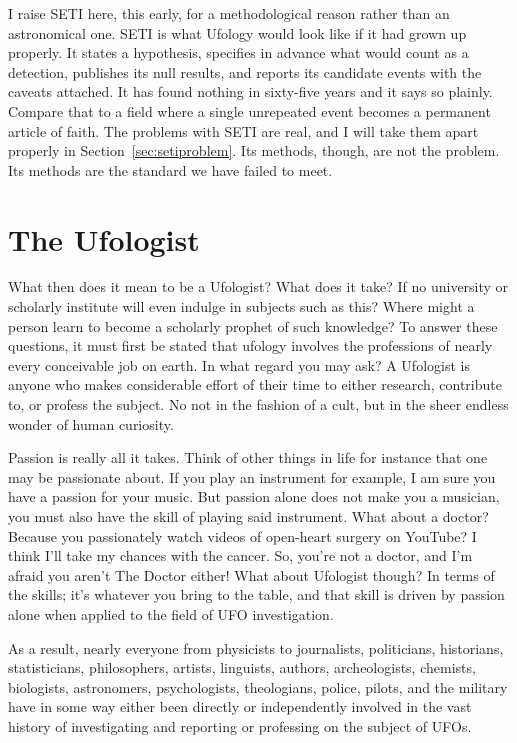 I raise SETI here, this early, for a methodological reason rather than an astronomical
one. SETI is what Ufology would look like if it had grown up properly. It states a
hypothesis, specifies in advance what would count as a detection, publishes its null
results, and reports its candidate events with the caveats attached. It has found nothing
in sixty-five years and it says so plainly. Compare that to a field where a single
unrepeated event becomes a permanent article of faith. The problems with SETI are real,
and I will take them apart properly in Section~\ref{sec:setiproblem}. Its methods,
though, are not the problem. Its methods are the standard we have failed to meet.

\section{The Ufologist}\label{sec:ufologist}

What then does it mean to be a Ufologist? What does it take? If no university or
scholarly institute will even indulge in subjects such as this? Where might a person
learn to become a scholarly prophet of such knowledge? To answer these questions, it
must first be stated that ufology involves the professions of nearly every conceivable
job on earth. In what regard you may ask? A Ufologist is anyone who makes considerable
effort of their time to either research, contribute to, or profess the subject. No not
in the fashion of a cult, but in the sheer endless wonder of human curiosity.

Passion is really all it takes. Think of other things in life for instance that one may
be passionate about. If you play an instrument for example, I am sure you have a passion
for your music. But passion alone does not make you a musician, you must also have the
skill of playing said instrument. What about a doctor? Because you passionately watch
videos of open-heart surgery on YouTube? I think I'll take my chances with the cancer.
So, you're not a doctor, and I'm afraid you aren't The Doctor either! What about
Ufologist though? In terms of the skills; it's whatever you bring to the table, and that
skill is driven by passion alone when applied to the field of UFO investigation.

As a result, nearly everyone from physicists to journalists, politicians, historians,
statisticians, philosophers, artists, linguists, authors, archeologists, chemists,
biologists, astronomers, psychologists, theologians, police, pilots, and the military
have in some way either been directly or independently involved in the vast history of
investigating and reporting or professing on the subject of UFOs.

